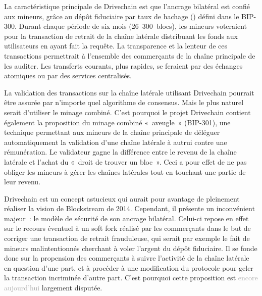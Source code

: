 La caractéristique principale de Drivechain est que l'ancrage bilatéral est confié aux mineurs, grâce au dépôt fiduciaire par taux de hachage () défini dans le BIP-300. Durant chaque période de six mois (26~300~blocs), les mineurs voteraient pour la transaction de retrait de la chaîne latérale distribuant les fonds aux utilisateurs en ayant fait la requête. La transparence et la lenteur de ces transactions permettrait à l'ensemble des commerçants de la chaîne principale de les auditer. Les transferts courants, plus rapides, se feraient par des échanges atomiques ou par des services centralisés.

La validation des transactions sur la chaîne latérale utilisant Drivechain pourrait être assurée par n'importe quel algorithme de consensus. Mais le plus naturel serait d'utiliser le minage combiné. C'est pourquoi le projet Drivechain contient également la proposition du minage combiné «~aveugle~» (BIP-301), une technique permettant aux mineurs de la chaîne principale de déléguer automatiquement la validation d'une chaîne latérale à autrui contre une rémunération. Le validateur gagne la différence entre le revenu de la chaîne latérale et l'achat du «~droit de trouver un bloc~». Ceci a pour effet de ne pas obliger les mineurs à gérer les chaînes latérales tout en touchant une partie de leur revenu. %

Drivechain est un concept astucieux qui aurait pour avantage de pleinement réaliser la vision de Blockstream de 2014. Cependant, il présente un inconvénient majeur~: le modèle de sécurité de son ancrage bilatéral. Celui-ci repose en effet sur le recours éventuel à un soft fork réalisé par les commerçants dans le but de corriger une transaction de retrait frauduleuse, qui serait par exemple le fait de mineurs malintentionnés cherchant à voler l'argent du dépôt fiduciaire. Il se fonde donc sur la propension des commerçants à suivre l'activité de la chaîne latérale en question d'une part, et à procéder à une modification du protocole pour geler la transaction incriminée d'autre part. C'est pourquoi cette proposition est \textcolor{darkgray}{encore aujourd'hui} largement disputée.

